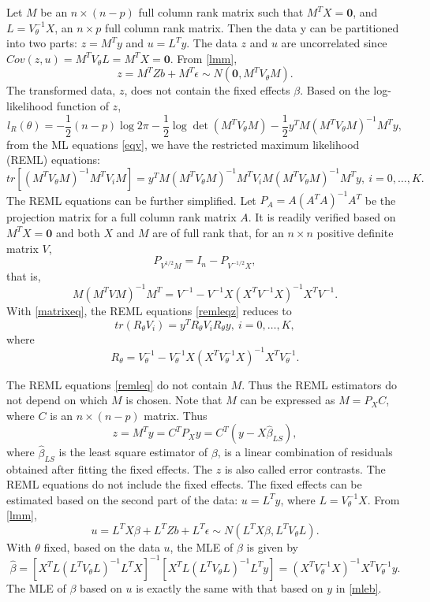 \documentclass[
]{article}
\begin{document}
Let \(M\) be an \(n\times (n-p)\) full column rank matrix such that
\(M^TX = \mathbf{0}\), and \(L = V_{\theta}^{-1}X\), an \(n\times p\)
full column rank matrix. Then the data y can be partitioned into two
parts: \(z = M^Ty\) and \(u = L^Ty\). The data \(z\) and \(u\) are
uncorrelated since \(Cov(z, u) = M^TV_{\theta}L = M^TX = \mathbf{0}\).
From \eqref{lmm},
\[z = M^TZb + M^T\epsilon \sim N(\mathbf{0}, M^TV_{\theta}M).\] The
transformed data, \(z\), does not contain the fixed effects \(\beta\).
Based on the log-likelihood function of \(z\),
\[l_R(\theta) = -\frac{1}{2}(n-p)\log 2\pi - \frac{1}{2}\log\det(M^TV_{\theta}M) - \frac{1}{2}y^TM(M^TV_{\theta}M)^{-1}M^Ty,\]
from the ML equations \eqref{eqv}, we have the restricted maximum
likelihood (REML) equations: \begin{equation}\label{remleqz}
tr[(M^TV_{\theta}M)^{-1}M^TV_iM] = y^TM(M^TV_{\theta}M)^{-1}M^TV_iM(M^TV_{\theta}M)^{-1}M^Ty, ~i = 0,\ldots, K.
\end{equation} The REML equations can be further simplified. Let
\(P_A = A(A^TA)^{-1}A^T\) be the projection matrix for a full column
rank matrix \(A\). It is readily verified based on \(M^TX = \mathbf{0}\)
and both \(X\) and \(M\) are of full rank that, for an \(n \times n\)
positive definite matrix \(V\), \[P_{V^{1/2}M} = I_n - P_{V^{-1/2}X},\]
that is, \begin{equation}\label{matrixeq}
M(M^TVM)^{-1}M^T = V^{-1} - V^{-1}X(X^TV^{-1}X)^{-1}X^TV^{-1}.
\end{equation} With \eqref{matrixeq}, the REML equations \eqref{remleqz}
reduces to \begin{equation}\label{remleq}
tr(R_{\theta}V_i) = y^TR_{\theta}V_iR_{\theta}y, ~i = 0,\ldots, K,
\end{equation} where \[
R_{\theta} = V_{\theta}^{-1} - V_{\theta}^{-1}X(X^TV_{\theta}^{-1}X)^{-1}X^TV_{\theta}^{-1}.
\]

The REML equations \eqref{remleq} do not contain \(M\). Thus the REML
estimators do not depend on which \(M\) is chosen. Note that \(M\) can
be expressed as \(M = P_XC\), where \(C\) is an \(n\times (n-p)\)
matrix. Thus \[z=M^Ty = C^TP_Xy = C^T(y-X\hat\beta_{LS}),\] where
\(\hat\beta_{LS}\) is the least square estimator of \(\beta\), is a
linear combination of residuals obtained after fitting the fixed
effects. The \(z\) is also called error contrasts. The REML equations do
not include the fixed effects. The fixed effects can be estimated based
on the second part of the data: \(u = L^Ty\), where
\(L = V_{\theta}^{-1}X\). From \eqref{lmm},
\[u = L^TX\beta + L^TZb + L^T\epsilon \sim N(L^TX\beta, L^TV_{\theta}L).\]
With \(\theta\) fixed, based on the data \(u\), the MLE of \(\beta\) is
given by \begin{equation}\label{remlb}
\hat\beta = [X^TL(L^TV_{\theta}L)^{-1}L^TX]^{-1}[X^TL(L^TV_{\theta}L)^{-1}L^Ty]
= (X^TV_{\theta}^{-1}X )^{-1}X^TV_{\theta}^{-1}y.
\end{equation} The MLE of \(\beta\) based on \(u\) is exactly the same
with that based on \(y\) in \eqref{mleb}.
\end{document}
